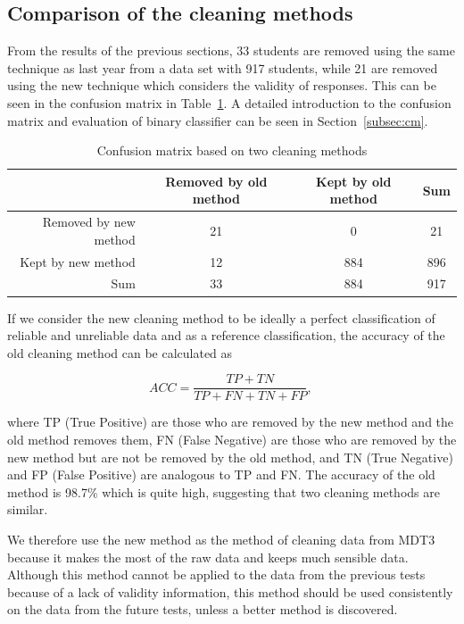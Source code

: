 \documentclass[a4paper]{report}
\begin{document}
\subsection{Comparison of the cleaning methods}

From the results of the previous sections, 33 students are removed using the same technique as last year from a data set with 917 students, while 21 are removed using the new technique which considers the validity of responses. This can be seen in the confusion matrix in Table~\ref{tab:EDA_cm}. A detailed introduction to the confusion matrix and evaluation of binary classifier can be seen in Section~\ref{subsec:cm}. 

\begin{table}[ht]
  \centering
  \begin{tabular}{r|cc|c}
    \hline
 & Removed by old method & Kept by old method & Sum \\ 
  \hline
Removed by new method & 21 & 0 & 21 \\ 
  Kept by new method & 12 & 884 & 896 \\ 
  \hline
  Sum & 33 & 884 & 917 \\ 
   \hline
  \end{tabular}
  \caption{\label{tab:EDA_cm}Confusion matrix based on two cleaning methods}
\end{table}

If we consider the new cleaning method to be ideally a perfect classification of reliable and unreliable data and as a reference classification, the accuracy of the old cleaning method can be calculated as 

$$ACC = \frac{TP + TN}{TP + FN + TN + FP} \text{, }$$

\noindent
where TP (True Positive) are those who are removed by the new method and the old method removes them, FN (False Negative) are those who are removed by the new method but are not be removed by the old method, and TN (True Negative) and FP (False Positive) are analogous to TP and FN. The accuracy of the old method is 98.7\% which is quite high, suggesting that two cleaning methods are similar. 

We therefore use the new method as the method of cleaning data from MDT3 because it makes the most of the raw data and keeps much sensible data. Although this method cannot be applied to the data from the previous tests because of a lack of validity information, this method should be used consistently on the data from the future tests, unless a better method is discovered. 
\end{document}
